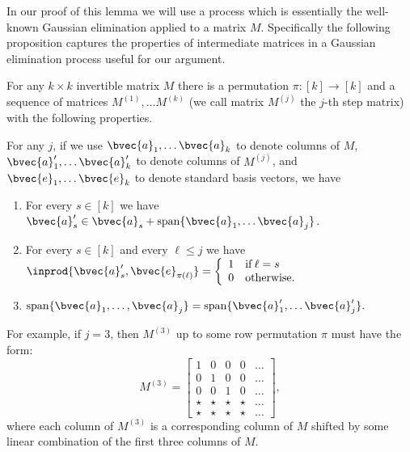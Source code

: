 \documentclass[11pt]{article}
\newcommand{\Mat}[1]{M^{(#1)}}
\begin{document}
In our proof of this lemma we will use a process which is essentially the well-known Gaussian elimination applied to a matrix $M$. Specifically the following proposition captures the properties of intermediate matrices in a Gaussian elimination process useful for our argument.


\begin{proposition}
	\label{prop:column-span}
	For any $k \times k$ invertible matrix $M$ there is a permutation $\pi : [k] \to [k]$ and a sequence of matrices $M^{(1)}, \ldots M^{(k)}$ (we call matrix $\Mat{j}$ the $j$-th step matrix) with the following properties.
	
	For any $j$, if we use $\bvec{a}_1, \ldots \bvec{a}_k$ to denote columns of $M$, $\bvec{a}'_1, \ldots \bvec{a}'_k$ to denote columns of $M^{(j)}$, and $\bvec{e}_1, \ldots \bvec{e}_k$ to denote standard basis vectors, we have
	\begin{enumerate}
		\item For every $s \in [k]$ we have $\bvec{a}'_s \in  \bvec{a}_s + \mathrm{span}\{\bvec{a}_1, \ldots \bvec{a}_{j}\}$.
		\item For every $s \in [k]$ and every $\ell \leq j$ we have $\inprod{\bvec{a}'_s, \bvec{e}_{\pi(\ell)}} = \left\{\begin{array}{ll} 1 & \mathrm{ if }\, \ell = s \\ 0 & \mathrm{otherwise.} \end{array}\right.$
		\item $\mathrm{span}\{\bvec{a}_1, \ldots, \bvec{a}_{j}\} = \mathrm{span}\{\bvec{a}'_1, \ldots \bvec{a}'_{j}\}.$
	\end{enumerate}
\end{proposition}
For example, if $j=3$, then $\Mat{3}$ up to some row permutation $\pi$ must have the form:
\begin{equation}
	\label{eq:M-3-example}
	\Mat{3} =
	\begin{bmatrix}
		1 		& 	0	& 	0 & 0 & \hdots\\
		0 		& 	1 	& 	0 & 0 & \hdots\\
		0       &   0   &	1&  0 & \hdots\\
		\star   & 	\star 	&	\star & \star & \hdots\\
		\star 	& 	\star	&	\star & \star & \hdots
	\end{bmatrix},
\end{equation}
where each column of $M^{(3)}$ is a corresponding column of $M$ shifted by some linear combination of the first three columns of $M$.
\end{document}
